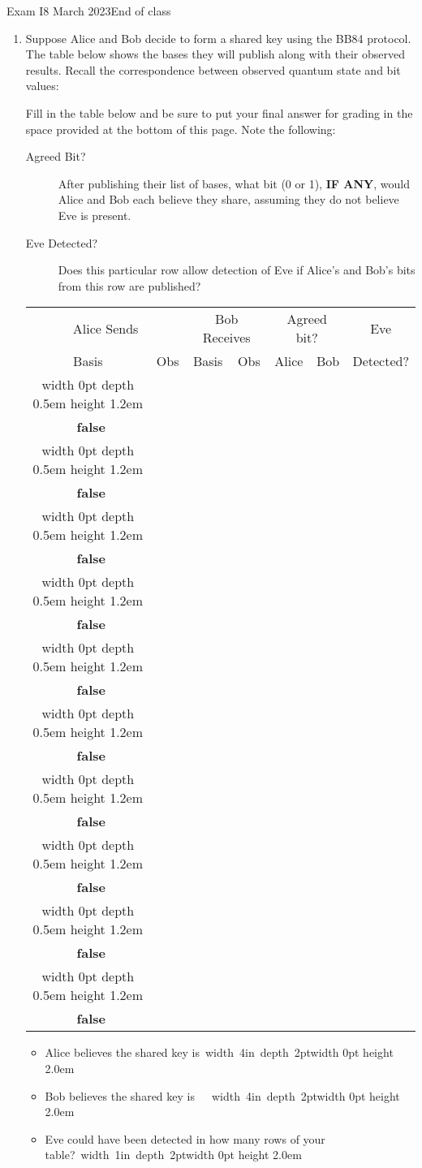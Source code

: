 \documentclass[12pt]{article}
\def\Obox#1{\Ovalbox{\hbox to 1ex{\vrule width 0pt height 1ex\hss #1\hss}}}
\def\TFMarked#1#2{\ \stackbox[l][m]{\Obox{#1}~\textbf{true}\\\Obox{#2}~\textbf{false}}}
\def\TF{\TFMarked{\relax}{\relax}}
\newcommand{\Blank}[1][1in]{\mbox{\vrule width #1 depth 2pt}\vrule width 0pt height 2.0em}
\begin{document}
\begin{assignment}{Exam I}{8 March 2023}{End of class}
\begin{enumerate}
\clearpage\item{}  Suppose Alice and Bob decide to form a shared key using the BB84 protocol.  The table below shows the bases they will publish along with their observed results.   Recall the correspondence between observed quantum state and bit values:
\begin{BBKey}
\begin{center}
\BBBasis{}
\end{center}
\end{BBKey}
\def\RowU#1#2#3#4{%
\vrule width 0pt depth 0.5em height 1.2em#1 &#2 & #3 & #4 & & & {\vrule width 0pt depth 13pt\small\TF{}}  \\ \hline}
\def\Row#1#2#3{%
\RowU{\STD}{#1}{#2}{#3}}
\def\RowX#1#2#3{%
\RowU{\HDM}{#1}{#2}{#3}}

Fill in the table below and be sure to put your final answer for grading in the space provided at the bottom of this page.  Note the following:
\begin{description}
  \item[Agreed Bit?]  After publishing their list of bases, what bit (0 or 1), \textbf{IF ANY}, would Alice and Bob each believe they share, assuming they do not believe Eve is present.
  \item[Eve Detected?] Does this particular row allow detection of Eve if Alice's and Bob's bits from this row are published?
\end{description}

\begin{BBKey}
\begin{center}\Large
\begin{tabular}{c|c||c|c||c|c||c}
\multicolumn{2}{c||}{Alice Sends} & \multicolumn{2}{c||}{Bob Receives}& \multicolumn{2}{c||}{Agreed bit?}&Eve \\
Basis & Obs & Basis & Obs & Alice & Bob & Detected?\\\hline
\RowX{\BBNe}{\HDM}{\BBNe}
\Row{\BBUp}{\STD}{\BBUp}
\RowX{\BBNe}{\HDM}{\BBSe}
\Row{\BBRt}{\STD}{\BBRt}
\Row{\BBUp}{\HDM}{\BBNe}
\Row{\BBUp}{\STD}{\BBUp}\Row{\BBRt}{\HDM}{\BBSe}
\RowX{\BBSe}{\HDM}{\BBSe}
\Row{\BBRt}{\STD}{\BBRt}
\RowX{\BBNe}{\HDM}{\BBNe}

\end{tabular}
\end{center}
\end{BBKey}
\begin{itemize}
    \item Alice believes the shared key is~\Blank[4in]{}
    \item Bob believes the shared key is\ \ ~\Blank[4in]{}
    \item Eve could have been detected in how many rows of your table?~\Blank{}
\end{itemize}


\end{enumerate}
\end{assignment}
\end{document}
